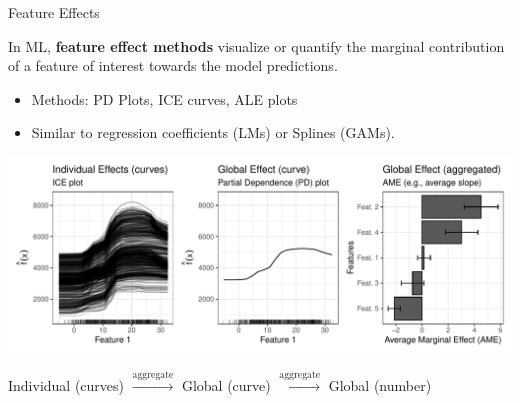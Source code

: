 \documentclass[11pt,compress,t,notes=noshow, aspectratio=169, xcolor=table]{beamer}
\begin{document}
\begin{vbframe}{Feature Effects}

In ML, \textbf{feature effect methods} visualize or quantify the marginal contribution of a feature of interest towards the model predictions. %
\begin{itemize}
\item Methods: PD Plots, ICE curves, ALE plots
\item Similar to regression coefficients (LMs) or Splines (GAMs).
\end{itemize}

\centerline{\includegraphics[width=\textwidth]{figure/feature-effect.pdf}}

\hspace{8px} \small Individual (curves) \hspace{2px}
$\xrightarrow[]{\text{aggregate}}$ \hspace{2px} Global (curve) \hspace{2px}
$\xrightarrow[]{\text{aggregate}}$ \hspace{2px} Global (number)


\end{vbframe}


%
%
%
%
\end{document}
